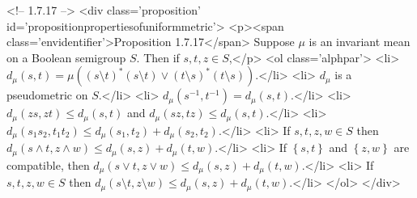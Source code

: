 <!-- 1.7.17 -->
<div class='proposition' id='propositionpropertiesofuniformmetric'>
	<p><span class='envidentifier'>Proposition 1.7.17</span>
	Suppose $\mu$ is an invariant mean on a Boolean semigroup $S$. Then if $s,t,z\in S$,</p>
	<ol class='alphpar'>
		<li> $d_\mu(s,t)=\mu\left((s\setminus t)^*(s\setminus t)\lor(t\setminus s)^*(t\setminus s)\right)$.</li>
		<li> $d_\mu$ is a pseudometric on $S$.</li>
		<li> $d_\mu(s^{-1},t^{-1})=d_\mu(s,t)$.</li>
		<li> $d_\mu(zs,zt)\leq d_\mu(s,t)$ and $d_\mu(sz,tz)\leq d_\mu(s,t)$.</li>
		<li> $d_\mu(s_1s_2,t_1t_2)\leq d_\mu(s_1,t_2)+d_\mu(s_2,t_2)$.</li>
		<li> If $s,t,z,w\in S$ then $d_\mu(s\land t,z\land w)\leq d_\mu(s,z)+d_\mu(t,w)$.</li>
		<li> If $\left\{s,t\right\}$ and $\left\{z,w\right\}$ are compatible, then $d_\mu(s\lor t,z\lor w)\leq d_\mu(s,z)+d_\mu(t,w)$.</li>
		<li> If $s,t,z,w\in S$ then $d_\mu(s\setminus t,z\setminus w)\leq d_\mu(s,z) +d_\mu(t,w)$.</li>
	</ol>
</div>

